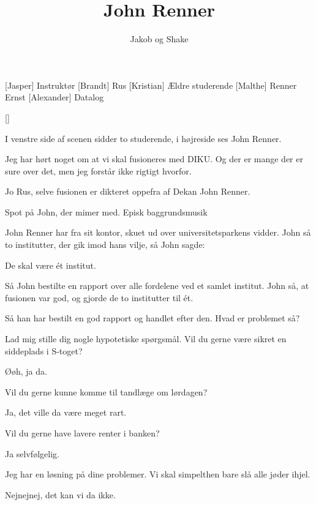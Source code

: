 \documentclass[a4paper,11pt]{article}
\title{John Renner}
\author{Jakob og Shake}
\begin{document}
\maketitle

\begin{roles}
[Jasper] Instruktør
[Brandt] Rus
[Kristian] Ældre studerende
[Malthe] Renner
 Ernst
[Alexander] Datalog
\end{roles}

\begin{props}
[]
\end{props}
  
\begin{sketch}
\scene I venstre side af scenen sidder to studerende, i højreside ses John Renner.


 Jeg har hørt noget om at vi skal fusioneres med DIKU. Og der er mange der er sure over det, men jeg forstår ikke rigtigt hvorfor.

 Jo Rus, selve fusionen er dikteret oppefra af Dekan John Renner.

\scene Spot på John, der mimer med.
\scene Episk baggrundsmusik

 John Renner har fra sit kontor, skuet ud over universitetsparkens vidder. John så to institutter, der gik imod hans vilje, så John sagde:

 De skal være ét institut.

 Så John bestilte en rapport over alle fordelene ved et samlet institut. John så, at fusionen var god, og gjorde de to institutter til ét. 

 Så han har bestilt en god rapport og handlet efter den. Hvad er problemet så?

 Lad mig stille dig nogle hypotetiske spørgsmål.
Vil du gerne være sikret en siddeplads i S-toget?

 Øøh, ja da.

 Vil du gerne kunne komme til tandlæge om lørdagen?

 Ja, det ville da være meget rart.

 Vil du gerne have lavere renter i banken?

 Ja selvfølgelig.

 Jeg har en løsning på dine problemer. Vi skal simpelthen bare slå alle jøder ihjel.

 Nejnejnej, det kan vi da ikke.


\end{sketch}
\end{document}
